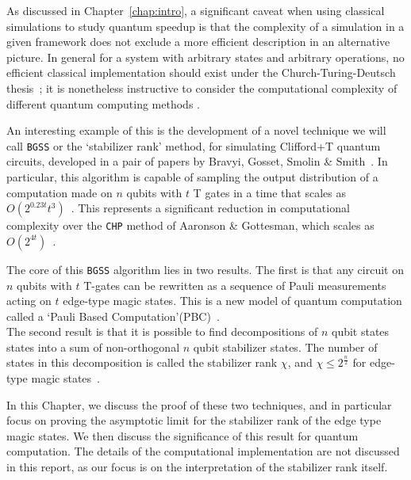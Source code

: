 \documentclass{standalone}
\begin{document}
As discussed in Chapter~\ref{chap:intro}, a significant caveat when using classical simulations to study quantum speedup is that the complexity of a simulation in a given framework does not exclude a more efficient description in an alternative picture. In general for a system with arbitrary states and arbitrary operations, no efficient classical implementation should exist under the Church-Turing-Deutsch thesis~\cite{Deutsch1985}; it is nonetheless instructive to consider the computational complexity of different quantum computing methods . 
\par
An interesting example of this is the development of a novel technique we will call \texttt{BGSS} or the `stabilizer rank' method, for simulating Clifford+T quantum circuits, developed in a pair of papers by Bravyi, Gosset, Smolin \& Smith~\cite{Bravyi2015,Bravyi2016b}. In particular, this algorithm is capable of sampling the output distribution of a computation made  on $n$ qubits with $t$ T gates in a time that scales as $O(2^{0.23t}t^{3})$~\cite{Bravyi2016b}. This represents a significant reduction in computational complexity over the \texttt{CHP} method of Aaronson \& Gottesman, which scales as $O(2^{4t})$~\cite{Aaronson2004a}.
\par
The core of this \texttt{BGSS} algorithm lies in two results. The first is that any circuit on $n$ qubits with $t$ T-gates can be rewritten as a sequence of Pauli measurements acting on $t$ edge-type magic states. This is a new model of quantum computation called a `Pauli Based Computation'(PBC)~\cite{Bravyi2015}. \\
The second result is that it is possible to find decompositions of $n$ qubit states states into a sum of non-orthogonal $n$ qubit stabilizer states. The number of states in this decomposition is called the stabilizer rank $\chi$, and $\chi\leq2^{\frac{n}{2}}$ for edge-type magic states~\cite{Bravyi2016b,Bravyi2015}.
\par
In this Chapter, we discuss the proof of these two techniques, and in particular focus on proving the asymptotic limit for the stabilizer rank of the edge type magic states. We then discuss the significance of this result for quantum computation. The details of the computational implementation are not discussed in this report, as our focus is on the interpretation of the stabilizer rank itself. 
\end{document}
